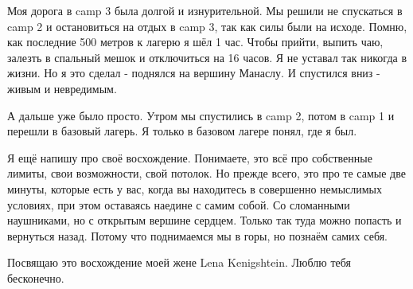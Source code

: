 Моя дорога в camp 3 была долгой и изнурительной. Мы решили не спускаться в camp
2 и остановиться на отдых в camp 3, так как силы были на исходе. Помню, как
последние 500 метров к лагерю я шёл 1 час. Чтобы прийти, выпить чаю, залезть в
спальный мешок и отключиться на 16 часов. Я не уставал так никогда в жизни. Но
я это сделал - поднялся на вершину Манаслу. И спустился вниз - живым и
невредимым. 

А дальше уже было просто. Утром мы спустились в camp 2, потом в camp 1 и
перешли в базовый лагерь. Я только в базовом лагере понял, где я был. 

Я ещё напишу про своё восхождение. Понимаете, это всё про собственные лимиты,
свои возможности, свой потолок. Но прежде всего, это про те самые две минуты,
которые есть у вас, когда вы находитесь в совершенно немыслимых условиях, при
этом оставаясь наедине с самим собой. Со сломанными наушниками, но с открытым
вершине сердцем. Только так туда можно попасть и вернуться назад. Потому что
поднимаемся мы в горы, но познаём самих себя. 

Посвящаю это восхождение моей жене Lena Kenigshtein. Люблю тебя бесконечно.

